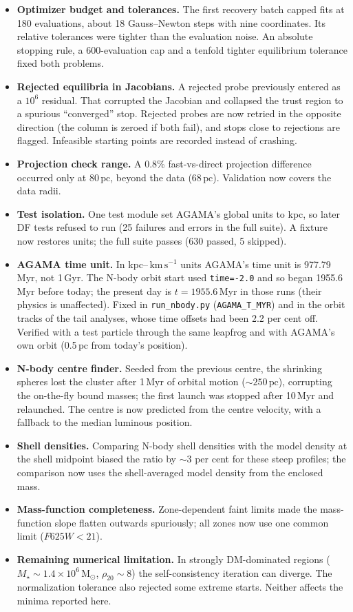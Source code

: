 \documentclass[11pt,a4paper]{article}
\newcommand{\Msun}{\ensuremath{\mathrm{M}_\odot}\xspace}
\newcommand{\pc}{\ensuremath{\,\mathrm{pc}}\xspace}
\newcommand{\kms}{\ensuremath{\,\mathrm{km\,s^{-1}}}\xspace}
\begin{document}
\begin{itemize}
\item \textbf{Optimizer budget and tolerances.} The first recovery batch
  capped fits at 180 evaluations, about 18 Gauss--Newton steps with nine
  coordinates. Its relative tolerances were tighter than the evaluation
  noise. An absolute stopping rule, a 600-evaluation cap and a tenfold
  tighter equilibrium tolerance fixed both problems.
\item \textbf{Rejected equilibria in Jacobians.} A rejected probe previously
  entered as a $10^6$ residual. That corrupted the Jacobian and collapsed the
  trust region to a spurious ``converged'' stop. Rejected probes are now
  retried in the opposite direction (the column is zeroed if both fail), and
  stops close to rejections are flagged. Infeasible starting points are
  recorded instead of crashing.
\item \textbf{Projection check range.} A 0.8\% fast-vs-direct projection
  difference occurred only at 80\pc, beyond the data (68\pc). Validation now
  covers the data radii.
\item \textbf{Test isolation.} One test module set AGAMA's global units to
  kpc, so later DF tests refused to run (25 failures and errors in the full
  suite). A fixture now restores units; the full suite passes (630 passed,
  5 skipped).
\item \textbf{AGAMA time unit.} In kpc--\kms units AGAMA's time unit is
  977.79\,Myr, not 1\,Gyr. The N-body orbit start used \texttt{time=-2.0}
  and so began 1955.6\,Myr before today; the present day is $t=1955.6$\,Myr
  in those runs (their physics is unaffected). Fixed in
  \texttt{run\_nbody.py} (\texttt{AGAMA\_T\_MYR}) and in the orbit tracks of
  the tail analyses, whose time offsets had been 2.2 per cent off. Verified
  with a test particle through the same leapfrog and with AGAMA's own orbit
  (0.5\pc from today's position).
\item \textbf{N-body centre finder.} Seeded from the previous centre, the
  shrinking spheres lost the cluster after 1\,Myr of orbital motion
  ($\sim250\pc$), corrupting the on-the-fly bound masses; the first launch
  was stopped after 10\,Myr and relaunched. The centre is now predicted
  from the centre velocity, with a fallback to the median luminous
  position.
\item \textbf{Shell densities.} Comparing N-body shell densities with the
  model density at the shell midpoint biased the ratio by $\sim3$ per cent
  for these steep profiles; the comparison now uses the shell-averaged
  model density from the enclosed mass.
\item \textbf{Mass-function completeness.} Zone-dependent faint limits made
  the mass-function slope flatten outwards spuriously; all zones now use one
  common limit ($F625W<21$).
\item \textbf{Remaining numerical limitation.} In strongly DM-dominated
  regions ($M_\star\sim1.4\times10^6\,\Msun$, $\rho_{20}\sim8$) the
  self-consistency iteration can diverge. The normalization tolerance also
  rejected some extreme starts. Neither affects the minima reported here.
\end{itemize}
\end{document}
